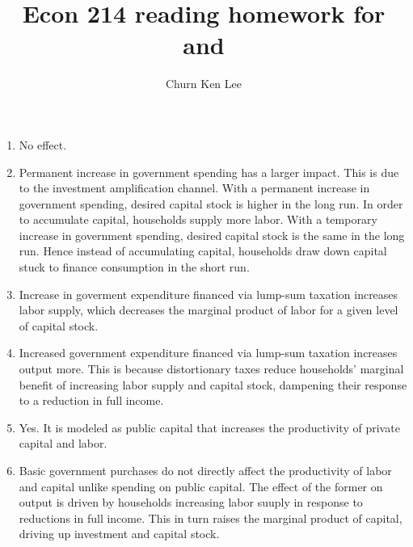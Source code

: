 \documentclass[12pt]{article}
\title{Econ 214 reading homework for \textcite{baxter_king_1993} and \textcite{woodford_2011}}
\author{Churn Ken Lee}
\date{}
\begin{document}
\maketitle

\section{\cite{baxter_king_1993}}
\begin{enumerate}
    \item No effect.
    \item Permanent increase in government spending has a larger impact. 
    This is due to the investment amplification channel. 
    With a permanent increase in government spending, desired capital stock is higher in the long run.
    In order to accumulate capital, households supply more labor.
    With a temporary increase in government spending, desired capital stock is the same in the long run.
    Hence instead of accumulating capital, households draw down capital stuck to finance consumption in the short run.
    \item Increase in goverment expenditure financed via lump-sum taxation increases labor supply, which decreases the marginal product of labor for a given level of capital stock.
    \item Increased government expenditure financed via lump-sum taxation increases output more. This is because distortionary taxes reduce households' marginal benefit of increasing labor supply and capital stock, dampening their response to a reduction in full income.
    \item Yes.
    It is modeled as public capital that increases the productivity of private capital and labor.
    \item Basic government purchases do not directly affect the productivity of labor and capital unlike spending on public capital.
    The effect of the former on output is driven by households increasing labor suuply in response to reductions in full income. This in turn raises the marginal product of capital, driving up investment and capital stock.
    
\end{enumerate}

\section{\cite{woodford_2011}}

\printbibliography
\end{document}

